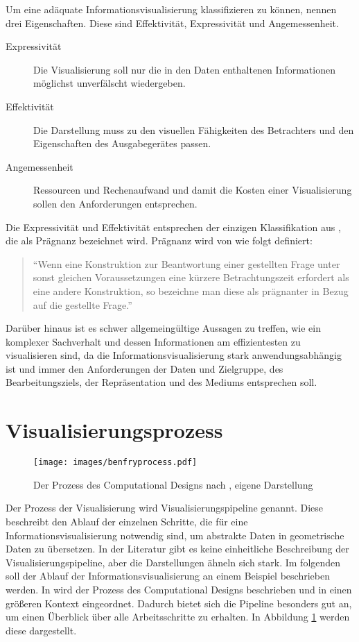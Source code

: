 \documentclass[a4paper, 12pt, DIVcalc, onepage, pdftex, headsepline, footsepline]{scrreprt}
\begin{document}
Um eine adäquate Informationsvisualisierung klassifizieren zu können, nennen \citep{Schumann} drei Eigenschaften.
Diese sind Effektivität, Expressivität und Angemessenheit.
\begin{description}
\item[Expressivität]
Die Visualisierung soll nur die in den Daten enthaltenen Informationen möglichst unverfälscht wiedergeben.
\item[Effektivität]
Die Darstellung muss zu den visuellen Fähigkeiten des Betrachters und den Eigenschaften des Ausgabegerätes
passen.
\item[Angemessenheit]
Ressourcen und Rechenaufwand und damit die Kosten einer Visualisierung sollen den Anforderungen entsprechen.
\end{description}
Die Expressivität und Effektivität entsprechen der einzigen Klassifikation aus \citep{Bertin}, die als Prägnanz bezeichnet wird.
Prägnanz wird von \citep[S.\,17]{Bertin} wie folgt definiert:
\begin{quote}
"`Wenn eine Konstruktion zur Beantwortung einer gestellten Frage unter sonst gleichen Voraussetzungen eine
kürzere Betrachtungszeit erfordert als eine andere Konstruktion, so bezeichne man diese als prägnanter in
Bezug auf die gestellte Frage."'
\end{quote}
Darüber hinaus ist es schwer allgemeingültige Aussagen zu treffen, wie ein komplexer Sachverhalt und dessen
Informationen am effizientesten zu visualisieren sind, da die Informationsvisualisierung stark anwendungsabhängig ist und
immer den Anforderungen der Daten und Zielgruppe, des Bearbeitungsziels, der Repräsentation und des Mediums entsprechen soll.

\section{Visualisierungsprozess}
\label{sec:Pipeline}
\begin{figure}
\centering
\texttt{[image: images/benfryprocess.pdf]}
\caption{Der Prozess des Computational Designs nach \citep[S.\,13]{BenFry}, eigene Darstellung}
\label{fig:benfryprocess}
\end{figure}
Der Prozess der Visualisierung wird Visualisierungspipeline genannt. Diese beschreibt den Ablauf der einzelnen
Schritte, die für eine Informationsvisualisierung notwendig sind, um abstrakte Daten in geometrische Daten
zu übersetzen. In der Literatur gibt es keine einheitliche Beschreibung der Visualisierungspipeline, aber
die Darstellungen ähneln sich stark. Im folgenden soll der Ablauf der Informationsvisualisierung an einem Beispiel
beschrieben werden. In \citep{BenFry} wird der Prozess des Computational Designs beschrieben und in einen
größeren Kontext eingeordnet. Dadurch bietet sich die
Pipeline besonders gut an, um einen Überblick über alle Arbeitsschritte zu erhalten. In Abbildung \ref{fig:benfryprocess}
werden diese dargestellt.
\end{document}
